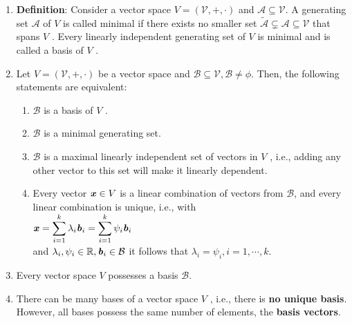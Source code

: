 \begin{enumerate}
    \item \textbf{Definition}: Consider a vector space $V = (\mathcal{V}, +, \cdot)$ and $\mathcal{A} \subseteq  \mathcal{V}$. 
    A generating set $\mathcal{A}$ of $V$ is called minimal if there exists no smaller set $\tilde{\mathcal{A}} \subsetneq \mathcal{A} \subseteq \mathcal{V}$ that spans $V$ . 
    Every linearly independent generating set of $V$ is minimal and is called a basis of $V$ .
    \hfill \cite{mfml/book/mml/Deisenroth-Faisal-Ong}

    \item Let $V = (\mathcal{V}, +, \cdot)$ be a vector space and $\mathcal{B} \subseteq \mathcal{V}, \mathcal{B} \neq \phi$. Then, the following statements are equivalent:
    \hfill \cite{mfml/book/mml/Deisenroth-Faisal-Ong}
    \begin{enumerate}
        \item $\mathcal{B}$ is a basis of $V$ .
        \hfill \cite{mfml/book/mml/Deisenroth-Faisal-Ong}

        \item $\mathcal{B}$ is a minimal generating set.
        \hfill \cite{mfml/book/mml/Deisenroth-Faisal-Ong}

        \item $\mathcal{B}$ is a maximal linearly independent set of vectors in $V$ , i.e., adding any other vector to this set will make it linearly dependent.
        \hfill \cite{mfml/book/mml/Deisenroth-Faisal-Ong}

        \item Every vector $\text{\textbf{\textit{x}}} \in V$ is a linear combination of vectors from $\mathcal{B}$, and every linear combination is unique, i.e., with
        \\
        $
            \text{\textbf{\textit{x}}} 
            = \displaystyle\sum_{i=1}^k \lambda_i \text{\textbf{\textit{b}}}_i
            = \displaystyle\sum_{i=1}^k \psi_i \text{\textbf{\textit{b}}}_i
        $
        \\
        and $\lambda_i , \psi_i \in \mathbb{R}, \text{\textbf{\textit{b}}}_i \in \mathcal{B}$ it follows that $\lambda_i = \psi_i , i = 1, \cdots , k$.
        \hfill \cite{mfml/book/mml/Deisenroth-Faisal-Ong}
    \end{enumerate}

    \item Every vector space $V$ possesses a basis $\mathcal{B}$.
    \hfill \cite{mfml/book/mml/Deisenroth-Faisal-Ong}

    \item There can be many bases of a vector space $V$ , i.e., there is \textbf{no unique basis}. 
    However, all bases possess the same number of elements, the \textbf{basis vectors}. 
    \hfill \cite{mfml/book/mml/Deisenroth-Faisal-Ong}


\end{enumerate}
